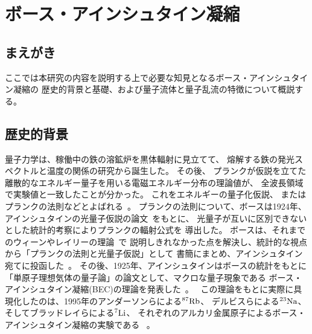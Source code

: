 \documentclass[12pt,a4paper]{jbook}
\begin{document}
	\pagestyle{fancy}
	\lhead{\leftmark}
	\chead{}
	\rhead{\thepage}
	\cfoot{}
	\tableofcontents
	\setcounter{page}{1}
    	\listoffigures %
	\newpage
	\normalsize

	\chapter{ボース・アインシュタイン凝縮}
		\section{まえがき}
		ここでは本研究の内容を説明する上で必要な知見となるボース・アインシュタイン凝縮の
        	歴史的背景と基礎、および量子流体と量子乱流の特徴について概説する。


		\section{歴史的背景}
		量子力学は、稼働中の鉄の溶鉱炉を黒体輻射に見立てて、
        	熔解する鉄の発光スペクトルと温度の関係の研究から誕生した。
        	その後、
        	プランクが仮説を立てた離散的なエネルギー量子を用いる電磁エネルギー分布の理論値が、
        	全波長領域で実験値と一致したことが分かった。
        	これをエネルギーの量子化仮説、
        	またはプランクの法則などとよばれる~\cite{Planck}。
		プランクの法則について、ボースは1924年、アインシュタインの光量子仮説の論文~\cite{A.Einstein1}をもとに、
		光量子が互いに区別できないとした統計的考察によりプランクの輻射公式を
		導出した。
        	ボースは、それまでのウィーンやレイリーの理論~\cite{Wien, Rayleigh}で
		説明しきれなかった点を解決し、統計的な視点から「プランクの法則と光量子仮説」として
		書簡にまとめ、アインシュタイン宛てに投函した~\cite{S.N.Bose}。
		その後、1925年、アインシュタインはボースの統計をもとに
		「単原子理想気体の量子論」の論文として、マクロな量子現象である
		ボース・アインシュタイン凝縮(BEC)の理論を発表した~\cite{A.Einstein2}。
		\ この理論をもとに実際に具現化したのは、1995年のアンダーソンらによる${\rm ^{87}Rb}$、
        	デルビスらによる${\rm ^{23}Na}$、そしてブラッドレイらによる${\rm ^{7}Li}$、
        	それぞれのアルカリ金属原子によるボース・アインシュタイン凝縮の実験である
		~\cite{Anderson,Davis, CCBradley, E.Cornel}。
\end{document}
